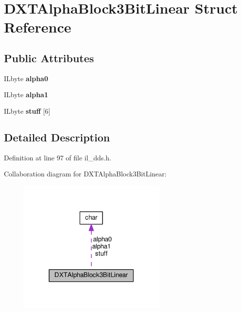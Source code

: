 \hypertarget{structDXTAlphaBlock3BitLinear}{}\section{D\+X\+T\+Alpha\+Block3\+Bit\+Linear Struct Reference}
\label{structDXTAlphaBlock3BitLinear}
\subsection*{Public Attributes}
\begin{DoxyCompactItemize}
\item 
\mbox{\label{structDXTAlphaBlock3BitLinear_a71c5e512855b29584b27b0e8f7153f7b}} 
I\+Lbyte {\bfseries alpha0}
\item 
\mbox{\label{structDXTAlphaBlock3BitLinear_accaf3a729961994af877f128d5307fc9}} 
I\+Lbyte {\bfseries alpha1}
\item 
\mbox{\label{structDXTAlphaBlock3BitLinear_a70c84e5c7a231fb6da73268faebf076b}} 
I\+Lbyte {\bfseries stuff} \mbox{[}6\mbox{]}
\end{DoxyCompactItemize}


\subsection{Detailed Description}


Definition at line 97 of file il\+\_\+dds.\+h.



Collaboration diagram for D\+X\+T\+Alpha\+Block3\+Bit\+Linear\+:
\nopagebreak
\begin{figure}[H]
\begin{center}
\leavevmode
\includegraphics[width=210pt]{d4/de3/structDXTAlphaBlock3BitLinear__coll__graph}
\end{center}
\end{figure}


